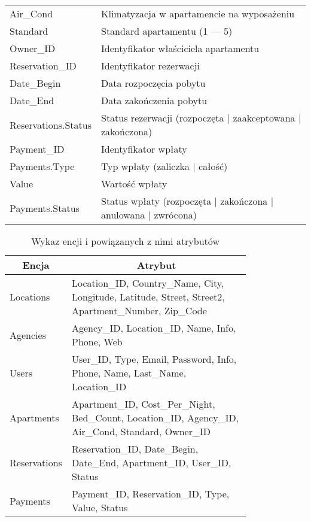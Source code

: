 \documentclass[polish, 11pt]{article}
\begin{document}
\begin{table}[H]
\begin{tabular}{ll}
                    Air\_Cond	&	Klimatyzacja w apartamencie na wyposażeniu	\\
                    Standard	&	Standard apartamentu (1 --- 5)	\\
                    Owner\_ID	&	Identyfikator właściciela apartamentu	\\
                    Reservation\_ID	&	Identyfikator rezerwacji	\\
                    Date\_Begin	&	Data rozpoczęcia pobytu	\\
                    Date\_End	&	Data zakończenia pobytu	\\
                    Reservations.Status	&	Status rezerwacji (rozpoczęta | zaakceptowana | zakończona)	\\
                    Payment\_ID	&	Identyfikator wpłaty	\\
                    Payments.Type	&	Typ wpłaty (zaliczka | całość)	\\
                    Value	&	Wartość wpłaty	\\
                    Payments.Status	&	Status wpłaty (rozpoczęta | zakończona | anulowana | zwrócona)	\\
                \bottomrule
                \end{tabular}
            \end{table}

            \begin{table}[H]
                \centering
                \caption{Wykaz encji i powiązanych z nimi atrybutów}\label{tab:entitiesAttributes}
                \begin{tabular}{lp{0.8\linewidth}}\toprule
                    \multicolumn{1}{c}{Encja}	&	\multicolumn{1}{c}{Atrybut}	\\\midrule
                    Locations	&	Location\_ID, Country\_Name, City, Longitude, Latitude, Street, Street2, Apartment\_Number, Zip\_Code	\\
                    Agencies	&	Agency\_ID, Location\_ID, Name, Info, Phone, Web	\\
                    Users	&	User\_ID, Type, Email, Password, Info, Phone, Name, Last\_Name, Location\_ID	\\
                    Apartments	&	Apartment\_ID, Cost\_Per\_Night, Bed\_Count, Location\_ID, Agency\_ID, Air\_Cond, Standard, Owner\_ID	\\
                    Reservations	&	Reservation\_ID, Date\_Begin, Date\_End, Apartment\_ID, User\_ID, Status	\\
                    Payments	&	Payment\_ID, Reservation\_ID, Type, Value, Status	\\
                \bottomrule
                \end{tabular}
            \end{table}
\end{document}
